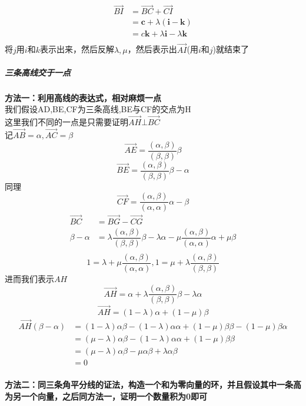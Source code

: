 \documentclass{article}
\newcommand{\ve}{\boldsymbol}
\begin{document}
\begin{CJK}{UTF8}{gkai}
\[
\begin{aligned}    
\overrightarrow{BI}&=\overrightarrow{BC}+\overrightarrow{CI}\\
&=\ve{c}+\lambda(\ve{i}-\ve{k})\\
&=c\ve{k}+\lambda\ve{i}-\lambda\ve{k}\\
\end{aligned}
\]
将$j$用$i$和$k$表示出来，然后反解$\lambda,\mu$，然后表示出$\overrightarrow{AI}$(用$i$和$j$)就结束了\\


\subparagraph{三条高线交于一点\\}
\textbf{方法一：利用高线的表达式，相对麻烦一点}\\
我们假设AD,BE,CF为三条高线,BE与CF的交点为H\\
这里我们不同的一点是只需要证明$\overrightarrow{AH}\bot \overrightarrow{BC}$\\
记$\overrightarrow{AB}=\alpha,\overrightarrow{AC}=\beta$\\
\[\overrightarrow{AE}=\dfrac{(\alpha,\beta)}{(\beta,\beta)}\beta\]
\[\overrightarrow{BE}=\dfrac{(\alpha,\beta)}{(\beta,\beta)}\beta-\alpha\]
同理
\[\overrightarrow{CF}=\dfrac{(\alpha,\beta)}{(\alpha,\alpha)}\alpha-\beta\]
\[
\begin{aligned}    
\overrightarrow{BC}&=\overrightarrow{BG}-\overrightarrow{CG}\\
\beta-\alpha&=\lambda\dfrac{(\alpha,\beta)}{(\beta,\beta)}\beta-\lambda\alpha-\mu\dfrac{(\alpha,\beta)}{(\alpha,\alpha)}\alpha+\mu\beta\\
\end{aligned}
\]
\[1=\lambda+\mu\dfrac{(\alpha,\beta)}{(\alpha,\alpha)},1=\mu+\lambda\dfrac{(\alpha,\beta)}{(\beta,\beta)}\]
进而我们表示$AH$\\
\[\overrightarrow{AH}=\alpha+\lambda\dfrac{(\alpha,\beta)}{(\beta,\beta)}\beta-\lambda\alpha\]
\[\overrightarrow{AH}=(1-\lambda)\alpha+(1-\mu)\beta\]
\[
\begin{aligned}    
\overrightarrow{AH}(\beta-\alpha)&=(1-\lambda)\alpha\beta-(1-\lambda)\alpha\alpha+(1-\mu)\beta\beta-(1-\mu)\beta\alpha\\
&=(\mu-\lambda)\alpha\beta-(1-\lambda)\alpha\alpha+(1-\mu)\beta\beta\\
&=(\mu-\lambda)\alpha\beta-\mu\alpha\beta+\lambda\alpha\beta\\
&=0\\
\end{aligned}
\]

\textbf{方法二：同三条角平分线的证法，构造一个和为零向量的环，并且假设其中一条高为另一个向量，之后同方法一，证明一个数量积为0即可}\\

\end{CJK}
\end{document}
